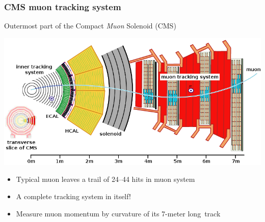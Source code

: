 \documentclass[compress]{beamer}
\begin{document}
\begin{frame}
\frametitle{CMS muon tracking system}

\vfill \vfill Outermost part of the Compact {\it Muon} Solenoid (CMS)

\includegraphics[width=\linewidth]{cms_slice.png}

\vfill\vfill\begin{itemize}
\item Typical muon leaves a trail of 24--44 hits in muon system
\item A complete tracking system in itself!
\item Measure muon momentum by curvature of its 7-meter \mbox{long track\hspace{-1 cm}}
\end{itemize}
\end{frame}
\end{document}

